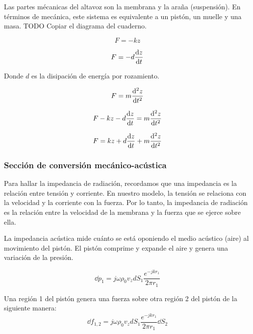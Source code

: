 \documentclass[12pt, a4paper]{article}
\begin{document}
Las partes mécanicas del altavoz son la membrana y la araña (suspensión). En términos de mecánica, este sistema es equivalente a un pistón, un muelle y una masa. TODO Copiar el diagrama del cuaderno.

\begin{equation} \label{eq:ley_hooke}
    F = -kz
\end{equation}

\begin{equation} \label{eq:amortiguamiento}
    F = -d \dv{z}{t}
\end{equation}

Donde $d$ es la disipación de energía por rozamiento.

\begin{equation} \label{eq:masa}
    F = m \dv[2]{z}{t}
\end{equation}

\begin{equation} \label{eq:ecuacion_seccion_mecanica}
    F - k z - d \dv{z}{t} = m \dv[2]{z}{t}
\end{equation}

\begin{equation} \label{eq:ecuacion_seccion_mecanica_2}
    F = kz + d \dv{z}{t} + m \dv[2]{z}{t}
\end{equation}

\subsubsection{Sección de conversión mecánico-acústica}

Para hallar la impedancia de radiación, recordamos que una impedancia es la relación entre tensión y corriente. En nuestro modelo, la tensión se relaciona con la velocidad y la corriente con la fuerza. Por lo tanto, la impedancia de radiación es la relación entre la velocidad de la membrana y la fuerza que se ejerce sobre ella.

La impedancia acústica mide cuánto se está oponiendo el medio acústico (aire) al movimiento del pistón. El pistón comprime y expande el aire y genera una variación de la presión.

\begin{equation} \label{eq:incremento_presion}
    \dd p_1 = j\omega\rho_0 v_z d S_1 \frac{e^{-jkr_1}}{2\pi r_1}
\end{equation}

Una región 1 del pistón genera una fuerza sobre otra región 2 del pistón de la siguiente manera: 
\begin{equation} \label{eq:presion_de_1_sobre_2}
    \dd f_{1,2} = j\omega \rho_0 v_z d S_1 \frac{e^{-jkr_1}}{2\pi r_1} \dd S_2
\end{equation}
\end{document}
